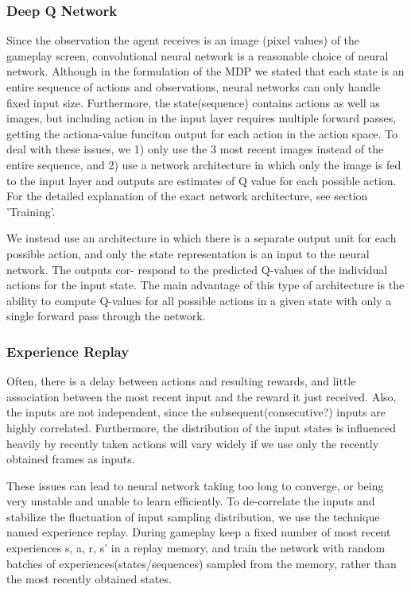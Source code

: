 \documentclass{article}
\begin{document}
\begin{multicols}{2}
\subsubsection{Deep Q Network}

Since the observation the agent receives is an image (pixel values) of the gameplay screen, convolutional neural network is a reasonable choice of neural network. Although in the formulation of the MDP we stated that each state is an entire sequence of actions and observations, neural networks can only handle fixed input size. Furthermore, the state(sequence) contains actions as well as images, but including action in the input layer requires multiple forward passes, getting the actiona-value funciton output for each action in the action space. To deal with these issues, we 1) only use the 3 most recent images instead of the entire sequence, and 2) use a network architecture in which only the image is fed to the input layer and outputs are estimates of Q value for each possible action. For the detailed explanation of the exact network architecture, see section 'Training'. 

We instead use an architecture in which there is a separate output unit for each possible action, and only the state representation is an input to the neural network. The outputs cor- respond to the predicted Q-values of the individual actions for the input state. The main advantage of this type of architecture is the ability to compute Q-values for all possible actions in a given state with only a single forward pass through the network.

\subsubsection{Experience Replay}

Often, there is a delay between actions and resulting rewards, and little association between the most recent input and the reward it just received. Also, the inputs are not independent, since the subsequent(consecutive?) inputs are highly correlated. Furthermore, the distribution of the input states is influenced heavily by recently taken actions will vary widely if we use only the recently obtained frames as inputs.    

These issues can lead to neural network taking too long to converge, or being very unstable and unable to learn efficiently. To de-correlate the inputs and stabilize the fluctuation of input sampling distribution, we use the technique named experience replay. During gameplay keep a fixed number of most recent experiences {s, a, r, s'} in a replay memory, and train the network with random batches of experiences(states/sequences) sampled from the memory, rather than the most recently obtained states. 


\end{multicols}
\end{document}
